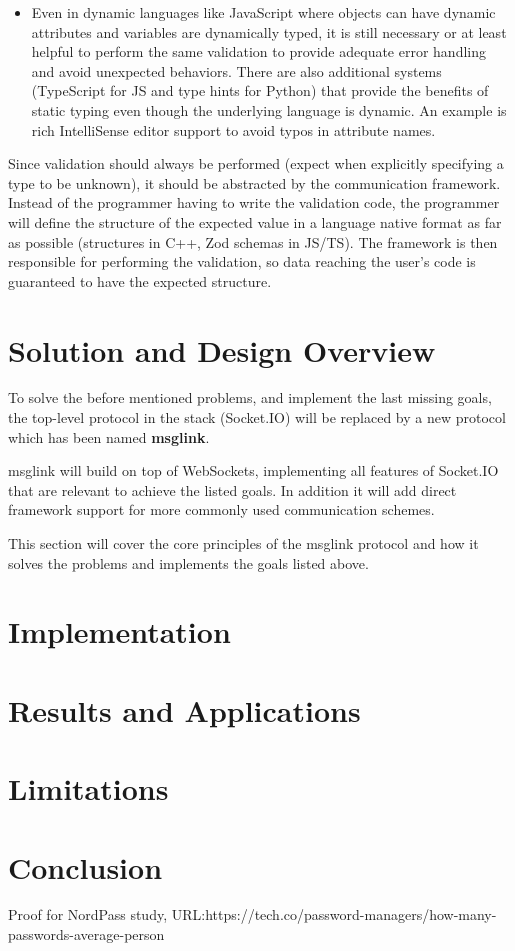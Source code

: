 \documentclass[conference]{IEEEtran}
\begin{document}
\begin{enumerate}
\begin{itemize}
        \item Even in dynamic languages like JavaScript where objects can have dynamic attributes and variables are dynamically typed, it is still necessary or at least helpful to perform the same validation to provide adequate error handling and avoid unexpected behaviors. There are also additional systems (TypeScript for JS and type hints for Python) that provide the benefits of static typing even though the underlying language is dynamic. An example is rich IntelliSense editor support to avoid typos in attribute names.
    \end{itemize}
    Since validation should always be performed (expect when explicitly specifying a type to be unknown), it should be abstracted by the communication framework. Instead of the programmer having to write the validation code, the programmer will define the structure of the expected value in a language native format as far as possible (structures in C++, Zod schemas in JS/TS). The framework is then responsible for performing the validation, so data reaching the user's code is guaranteed to have the expected structure.
\end{enumerate}


\section{Solution and Design Overview}

To solve the before mentioned problems, and implement the last missing goals, the top-level protocol in the stack (Socket.IO) will be replaced by a new protocol which has been named \textbf{msglink}.

msglink will build on top of WebSockets, implementing all features of Socket.IO that are relevant to achieve the listed goals. In addition it will add direct framework support for more commonly used communication schemes.

This section will cover the core principles of the msglink protocol and how it solves the problems and implements the goals listed above.


\section{Implementation}

\section{Results and Applications}

\section{Limitations}

\section{Conclusion}




\listoffigures

\begin{thebibliography}{00}

     Proof for NordPass study, URL:https://tech.co/password-managers/how-many-passwords-average-person

\end{thebibliography}
\end{document}
